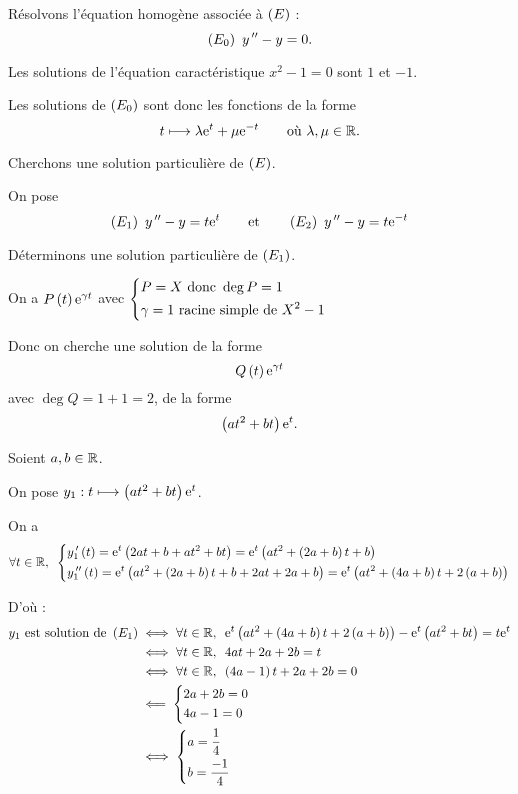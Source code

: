 \begin{corr}[2]
Résolvons l'équation homogène associée à \(\left(E\right)\) : \[\left(E_0\right)~y^{\,\prime\prime}-y=0.\]

Les solutions de l'équation caractéristique \(x^2-1=0\) sont \(1\) et \(-1\).

Les solutions de \(\left(E_0\right)\) sont donc les fonctions de la forme \[t\longmapsto\lambda\mathrm{e}^{t}+\mu\mathrm{e}^{-t}\qquad\text{où }\lambda,\mu\in\mathbb{R}.\]

Cherchons une solution particulière de \(\left(E\right)\).

On pose \[\left(E_1\right)~y^{\,\prime\prime}-y=t\mathrm{e}^{t}\qquad\text{et}\qquad\left(E_2\right)~y^{\,\prime\prime}-y=t\mathrm{e}^{-t}\]

Déterminons une solution particulière de \(\left(E_1\right)\).

\begin{brouill}
On a \(P\left(t\right)\mathrm{e}^{\gamma t}\) avec \(\begin{dcases}
P=X\text{ donc }\deg P=1 \\
\gamma=1\text{ racine simple de }X^2-1
\end{dcases}\)

Donc on cherche une solution de la forme \[Q\left(t\right)\mathrm{e}^{\gamma t}\] avec \(\deg Q=1+1=2\), \cad de la forme \[\left(at^2+bt\right)\mathrm{e}^{t}.\]
\end{brouill}

Soient \(a,b\in\mathbb{R}\).

On pose \(y_1:t\longmapsto\left(at^2+bt\right)\mathrm{e}^{t}\).

On a \[\quantifs{\forall t\in\R}\begin{dcases}
y_1\prim\paren{t}=\e{t}\paren{2at+b+at^2+bt}=\e{t}\paren{at^2+\paren{2a+b}t+b} \\
y_1\seconde\paren{t}=\e{t}\paren{at^2+\paren{2a+b}t+b+2at+2a+b}=\e{t}\paren{at^2+\paren{4a+b}t+2\paren{a+b}}
\end{dcases}\]

D'où : \[\begin{aligned}
y_1\text{ est solution de }\paren{E_1}&\ssi\quantifs{\forall t\in\R}\e{t}\paren{at^2+\paren{4a+b}t+2\paren{a+b}}-\e{t}\paren{at^2+bt}=t\e{t} \\
&\ssi\quantifs{\forall t\in\R}4at+2a+2b=t \\
&\ssi\quantifs{\forall t\in\R}\paren{4a-1}t+2a+2b=0 \\
&\impr\begin{dcases}
2a+2b=0 \\
4a-1=0
\end{dcases} \\
&\ssi\begin{dcases}
a=\dfrac{1}{4} \\
b=\dfrac{-1}{4}
\end{dcases}
\end{aligned}\]


\end{corr}
